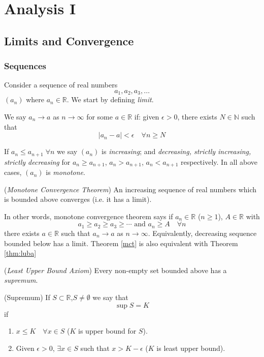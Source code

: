 \documentclass[10pt, a4paper, twoside]{report}
\begin{document}
\chapter{Analysis I}
\section{Limits and Convergence}
\subsection{Sequences}
Consider a sequence of real numbers
\[a_1,a_2,a_3,\ldots\]
\((a_n)\) where \(a_n\in\mathbb{R}\).
We start by defining \emph{limit}.
\begin{definition}
    We say \(a_n\to a\) as \(n\to\infty\) for some \(a\in\mathbb{R}\) if: given \(\epsilon>0\), there exists \(N\in\mathbb{N}\) such that
    \[|a_n-a|<\epsilon\quad\forall n\geq N\]
    \label{def:limit}
\end{definition}
If \(a_n\leq a_{n+1}\;\forall n\) we say \((a_n)\) is \emph{increasing}; and \emph{decreasing, strictly increasing, strictly decreasing} for \(a_n\geq a_{n+1}\), \(a_n>a_{n+1}\), \(a_n<a_{n+1}\) respectively. In all above cases, \((a_n)\) is \emph{monotone}.
\begin{theorem}
    (\emph{Monotone Convergence Theorem}) An increasing sequence of real numbers which is bounded above converges (i.e. it has a limit).
    \label{mct}
\end{theorem}
In other words, monotone convergence theorem says if \(a_n\in\mathbb{R}\) (\(n\geq 1\)), \(A\in\mathbb{R}\) with
\[a_1\geq a_2\geq a_3\geq\cdots\text{  and  }a_n\geq A\quad\forall n\]
there exists \(a\in\mathbb{R}\) such that \(a_n\to a\) as \(n\to\infty\). Equivalently, decreasing sequence bounded below has a limit. Theorem \ref{mct} is also equivalent with Theorem \ref{thm:luba}
\begin{theorem}
    (\emph{Least Upper Bound Axiom}) Every non-empty set bounded above has a \emph{supremum}.
    \label{thm:luba}
\end{theorem}
\begin{definition}
    (Supremum) If \(S\subset\mathbb{R}\),\(S\neq\emptyset\) we say that
    \[\sup S=K\]
    if 
    \begin{enumerate}
        \item \(x\leq K\quad\forall x\in S\) (\(K\) is upper bound for \(S\)).
        \item Given \(\epsilon>0\), \(\exists x\in S\) such that \(x>K-\epsilon\) (\(K\) is least upper bound).
    \end{enumerate}
    \label{def:sup}
\end{definition}
\end{document}
